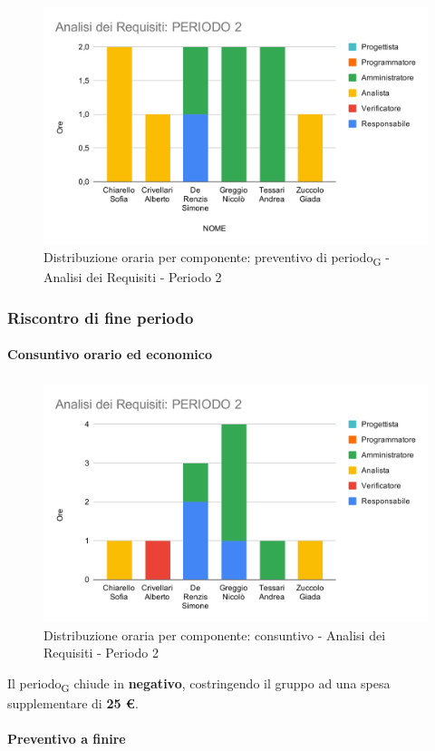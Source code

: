 \begin{figure}[H]
	\centering
	\includegraphics[scale=2]{res/images/charts/preventivo/analisi_2.png}
	\caption{Distribuzione oraria per componente: preventivo di periodo\textsubscript{G} - Analisi dei Requisiti - Periodo 2}
\end{figure}



\subsubsection{Riscontro di fine periodo}


\paragraph{Consuntivo orario ed economico}
\subparagraph*{}

\contabilitaTable{
	
}

\begin{figure}[H]
	\centering
	\includegraphics[scale=2]{res/images/charts/consuntivo/analisi_2.png}
	\caption{Distribuzione oraria per componente: consuntivo - Analisi dei Requisiti - Periodo 2}
\end{figure}

Il periodo\textsubscript{G} chiude in \textbf{negativo}, costringendo il gruppo ad una spesa supplementare di \textbf{25 \euro}. 


\paragraph{Preventivo a finire}
\subparagraph*{}

\pafTable{
	
}